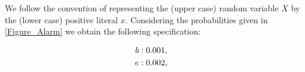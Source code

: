 \documentclass{article}
\newcommand{\at}[1]{\ensuremath{\!\del{#1}}}
\newcommand{\prfunc}{\ensuremath{\mathrm{P}}}
\newcommand{\pr}[1]{\ensuremath{\prfunc\at{#1}}}
\newcommand{\given}{\ensuremath{~\middle|~}}
\newcommand{\probfact}[2]{\ensuremath{#1:#2}}%
\begin{document}
\begin{figure*}
\begin{center}
	\end{center}
	\caption{The Earthquake, Burglary, Alarm model}
	\label{Figure_Alarm}
\end{figure*}

We follow the convention of representing the (upper case) random
variable $X$ by the (lower case) positive literal $x$.
%
Considering the probabilities given in \cref{Figure_Alarm} we obtain
the following spe\-ci\-fi\-ca\-tion:

\begin{equation*}
	\begin{aligned}
		\probfact{b}{0.001} & ,\cr
		\probfact{e}{0.002} & ,\cr
	\end{aligned}
	\label{eq:not_so_simple_example}
\end{equation*}
\end{document}
